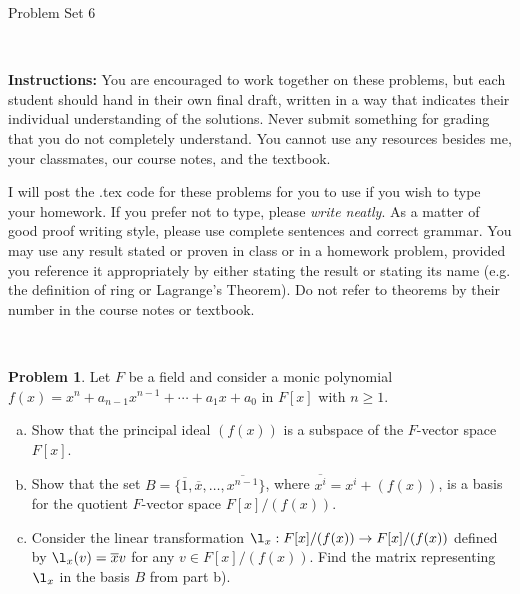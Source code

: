 \documentclass[11pt]{article}
\title{}
\date{\vspace{-0.5in}}
\newcommand{\ov}[1]{\overline{#1}}
\theoremstyle{definition}
\newtheorem{problem}{Problem}
\begin{document}
\thispagestyle{fancy}
\pagestyle{fancy}

\vspace{3em}

\begin{center}
	{\LARGE Problem Set 6}
\end{center}

\

\noindent
{\bf Instructions:}
You are encouraged to work together on these problems, but each student should hand in their own final draft, written in a way that indicates their individual understanding of the solutions. Never submit something for grading that you do not completely understand. You cannot use any resources besides me, your classmates, our course notes, and the textbook.


I will post the .tex code for these problems for you to use if you wish to type your homework. If you prefer not to type, please  {\em write neatly}. As a matter of good proof writing style, please use complete sentences and correct grammar. You may use any result  stated or proven in class or in a homework problem, provided you reference it appropriately by either stating the result or stating its name (e.g. the definition of ring or Lagrange's Theorem). Do not refer to theorems by their number in the course notes or textbook.


\





\begin{problem}
Let $F$ be a field and consider a monic polynomial $f(x)=x^n+a_{n-1}x^{n-1}+\cdots+a_1x+a_0$ in $F[x]$ with $n \geqslant 1$.
\begin{enumerate}[a)]
\item Show that the principal ideal $(f(x))$ is a subspace of the $F$-vector space $F[x]$.
\item Show that  the set $B=\{\ov{1},\ov{x},\ldots,\ov{x^{n-1}}\}$, where $\ov{x^i}=x^i+(f(x))$, is a basis for the quotient $F$-vector space $F[x]/(f(x))$.
\item Consider the linear transformation $\l_x : F [x]/(f (x)) \to F[x]/(f(x))$ defined by $\l_x(v)=\ov{x}v$ for any $v\in F [x]/(f (x))$. Find the matrix representing $\l_x$ in the basis $B$ from part b).
\end{enumerate}	
\end{problem}
\end{document}
